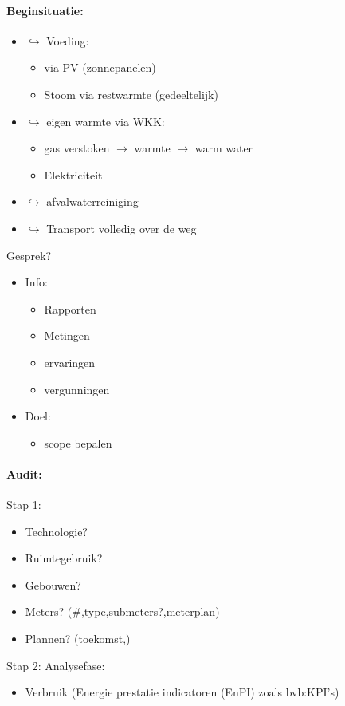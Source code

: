 \documentclass[12pt]{article}
\begin{document}
\paragraph{Beginsituatie:}\begin{itemize}
    \item $\hookrightarrow$ Voeding:\begin{itemize}
        \item via PV (zonnepanelen)
        \item Stoom via restwarmte (gedeeltelijk)
    \end{itemize}
    \item $\hookrightarrow$ eigen warmte via WKK:\begin{itemize}
        \item gas verstoken $\rightarrow$ warmte $\rightarrow$ warm water
        \item Elektriciteit
    \end{itemize}
    \item $\hookrightarrow$ afvalwaterreiniging 
    \item $\hookrightarrow$ Transport volledig over de weg
\end{itemize}
Gesprek?\begin{itemize}
    \item Info:\begin{itemize}
        \item Rapporten 
        \item Metingen 
        \item ervaringen
        \item vergunningen
    \end{itemize}
    \item Doel:\begin{itemize}
        \item scope bepalen
    \end{itemize}
\end{itemize}
\paragraph{Audit:}
Stap 1:\begin{itemize}
    \item Technologie? 
    \item Ruimtegebruik?
    \item Gebouwen?
    \item Meters? (\#,type,submeters?,meterplan)
    \item Plannen? (toekomst,)
\end{itemize}
Stap 2: Analysefase:\begin{itemize}
    \item Verbruik (Energie prestatie indicatoren (EnPI) zoals bvb:KPI's)
\end{itemize}
\end{document}
